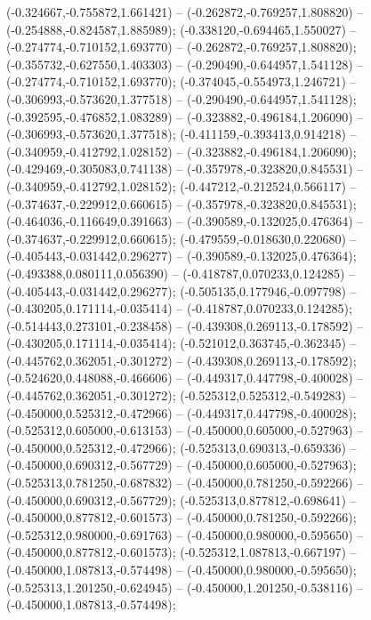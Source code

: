  (-0.324667,-0.755872,1.661421) -- (-0.262872,-0.769257,1.808820) -- (-0.254888,-0.824587,1.885989);
 (-0.338120,-0.694465,1.550027) -- (-0.274774,-0.710152,1.693770) -- (-0.262872,-0.769257,1.808820);
 (-0.355732,-0.627550,1.403303) -- (-0.290490,-0.644957,1.541128) -- (-0.274774,-0.710152,1.693770);
 (-0.374045,-0.554973,1.246721) -- (-0.306993,-0.573620,1.377518) -- (-0.290490,-0.644957,1.541128);
 (-0.392595,-0.476852,1.083289) -- (-0.323882,-0.496184,1.206090) -- (-0.306993,-0.573620,1.377518);
 (-0.411159,-0.393413,0.914218) -- (-0.340959,-0.412792,1.028152) -- (-0.323882,-0.496184,1.206090);
 (-0.429469,-0.305083,0.741138) -- (-0.357978,-0.323820,0.845531) -- (-0.340959,-0.412792,1.028152);
 (-0.447212,-0.212524,0.566117) -- (-0.374637,-0.229912,0.660615) -- (-0.357978,-0.323820,0.845531);
 (-0.464036,-0.116649,0.391663) -- (-0.390589,-0.132025,0.476364) -- (-0.374637,-0.229912,0.660615);
 (-0.479559,-0.018630,0.220680) -- (-0.405443,-0.031442,0.296277) -- (-0.390589,-0.132025,0.476364);
 (-0.493388,0.080111,0.056390) -- (-0.418787,0.070233,0.124285) -- (-0.405443,-0.031442,0.296277);
 (-0.505135,0.177946,-0.097798) -- (-0.430205,0.171114,-0.035414) -- (-0.418787,0.070233,0.124285);
 (-0.514443,0.273101,-0.238458) -- (-0.439308,0.269113,-0.178592) -- (-0.430205,0.171114,-0.035414);
 (-0.521012,0.363745,-0.362345) -- (-0.445762,0.362051,-0.301272) -- (-0.439308,0.269113,-0.178592);
 (-0.524620,0.448088,-0.466606) -- (-0.449317,0.447798,-0.400028) -- (-0.445762,0.362051,-0.301272);
 (-0.525312,0.525312,-0.549283) -- (-0.450000,0.525312,-0.472966) -- (-0.449317,0.447798,-0.400028);
 (-0.525312,0.605000,-0.613153) -- (-0.450000,0.605000,-0.527963) -- (-0.450000,0.525312,-0.472966);
 (-0.525313,0.690313,-0.659336) -- (-0.450000,0.690312,-0.567729) -- (-0.450000,0.605000,-0.527963);
 (-0.525313,0.781250,-0.687832) -- (-0.450000,0.781250,-0.592266) -- (-0.450000,0.690312,-0.567729);
 (-0.525313,0.877812,-0.698641) -- (-0.450000,0.877812,-0.601573) -- (-0.450000,0.781250,-0.592266);
 (-0.525312,0.980000,-0.691763) -- (-0.450000,0.980000,-0.595650) -- (-0.450000,0.877812,-0.601573);
 (-0.525312,1.087813,-0.667197) -- (-0.450000,1.087813,-0.574498) -- (-0.450000,0.980000,-0.595650);
 (-0.525313,1.201250,-0.624945) -- (-0.450000,1.201250,-0.538116) -- (-0.450000,1.087813,-0.574498);
